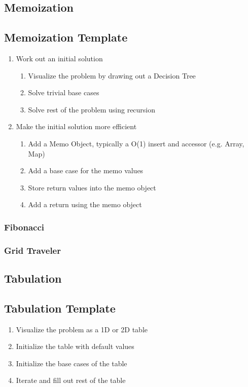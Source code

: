 \documentclass{article}
\begin{document}
\subsection{Memoization}

\subsection{Memoization Template}

\begin{enumerate}
	\item Work out an initial solution
		\begin{enumerate}
			\item Visualize the problem by drawing out a Decision Tree
			\item Solve trivial base cases
			\item Solve rest of the problem using recursion
		\end{enumerate}
	\item Make the initial solution more efficient
		\begin{enumerate}
			\item Add a Memo Object, typically a O(1) insert and accessor (e.g. Array, Map)
			\item Add a base case for the memo values
			\item Store return values into the memo object
			\item Add a return using the memo object
		\end{enumerate}
\end{enumerate}

\subsubsection{Fibonacci}

\subsubsection{Grid Traveler}

\subsection{Tabulation}

\subsection{Tabulation Template}

\begin{enumerate}
	\item Visualize the problem as a 1D or 2D table
	\item Initialize the table with default values
	\item Initialize the base cases of the table
	\item Iterate and fill out rest of the table 
\end{enumerate}
\end{document}
